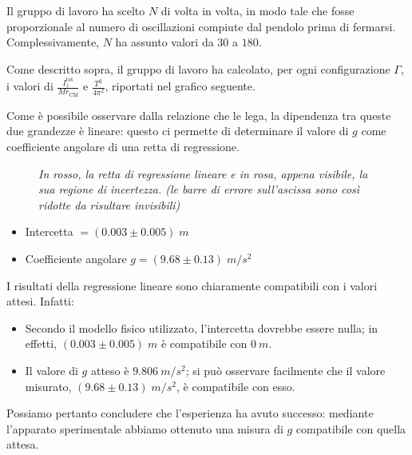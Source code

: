 \documentclass{article}
\begin{document}
Il gruppo di lavoro ha scelto $N$ di volta in volta, in modo tale che
fosse proporzionale al numero di oscillazioni compiute dal pendolo
prima di fermarsi. Complessivamente, $N$ ha assunto valori da $30$ a
$180$.

\vspace{2mm}

Come descritto sopra, il gruppo di lavoro ha calcolato, per ogni
configurazione $\Gamma$,
i valori di $\frac{I_z^\text{tot}}{Mr_\text{CM}}$
e $\frac{T^2}{4\pi^2}$, riportati nel grafico seguente.

Come è possibile osservare dalla relazione che le lega, la dipendenza
tra queste due grandezze è lineare: questo ci permette di determinare
il valore di $g$ come coefficiente angolare di una retta di regressione.

\begin{center}
\begin{figure}[H]
  \caption[]{\emph{
    In rosso, la retta di regressione lineare e in rosa,
    appena visibile, la sua regione di incertezza.
    (le barre di errore sull'ascissa sono così ridotte
    da risultare invisibili)
  }}
\end{figure}
\end{center}

\begin{itemize}
  \item Intercetta $= (0.003 \pm 0.005)\;\unit{m}$
  \item Coefficiente angolare $g = (9.68 \pm 0.13)\;\unit{m\per s^2}$
\end{itemize}
\pagebreak
I risultati della regressione lineare sono chiaramente compatibili
con i valori attesi. Infatti:
\begin{itemize}
  \item Secondo il modello fisico utilizzato, l'intercetta dovrebbe
  essere nulla; in effetti, $(0.003\pm0.005)\;\unit{m}$ è compatibile
  con $\qty{0}{m}$.
  \item Il valore di $g$ atteso è $\qty{9.806}{m\per s^2}$; si può
  osservare facilmente che il valore misurato,
  $(9.68\pm0.13)\;\unit{m \per s^2}$, è compatibile con esso.
\end{itemize}

Possiamo pertanto concludere che l'esperienza ha avuto successo:
mediante l'apparato sperimentale abbiamo ottenuto una misura di $g$
compatibile con quella attesa.
\end{document}
